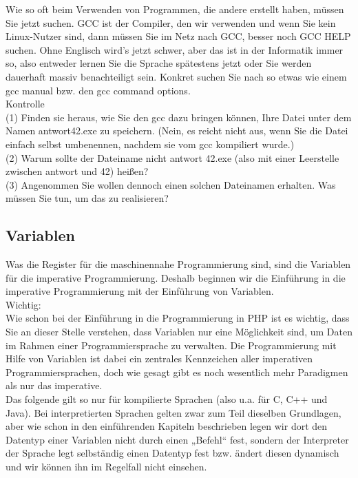 Wie so oft beim Verwenden von Programmen, die andere erstellt haben, müssen Sie jetzt suchen. GCC ist der Compiler, den wir verwenden und wenn Sie kein Linux-Nutzer sind, dann müssen Sie im Netz nach GCC, besser noch GCC HELP suchen. Ohne Englisch wird’s jetzt schwer, aber das ist in der Informatik immer so, also entweder lernen Sie die Sprache spätestens jetzt oder Sie werden dauerhaft massiv benachteiligt sein. Konkret suchen Sie nach so etwas wie einem gcc manual bzw. den gcc command options.\\

Kontrolle\\

(1)	Finden sie heraus, wie Sie den gcc dazu bringen können, Ihre Datei unter dem Namen antwort42.exe zu speichern. (Nein, es reicht nicht aus, wenn Sie die Datei einfach selbst umbenennen, nachdem sie vom gcc kompiliert wurde.)\\

(2)	Warum sollte der Dateiname nicht antwort 42.exe (also mit einer Leerstelle zwischen antwort und 42) heißen?\\

(3)	Angenommen Sie wollen dennoch einen solchen Dateinamen erhalten. Was müssen Sie tun, um das zu realisieren?\\

\subsection{Variablen}

Was die Register für die maschinennahe Programmierung sind, sind die Variablen für die imperative Programmierung. Deshalb beginnen wir die Einführung in die imperative Programmierung mit der Einführung von Variablen.\\

Wichtig:\\

Wie schon bei der Einführung in die Programmierung in PHP ist es wichtig, dass Sie an dieser Stelle verstehen, dass Variablen nur eine Möglichkeit sind, um Daten im Rahmen einer Programmiersprache zu verwalten. Die Programmierung mit Hilfe von Variablen ist dabei ein zentrales Kennzeichen aller imperativen Programmiersprachen, doch wie gesagt gibt es noch wesentlich mehr Paradigmen als nur das imperative.\\

Das folgende gilt so nur für kompilierte Sprachen (also u.a. für C, C++ und Java). Bei interpretierten Sprachen gelten zwar zum Teil dieselben Grundlagen, aber wie schon in den einführenden Kapiteln beschrieben legen wir dort den Datentyp einer Variablen nicht durch einen „Befehl“ fest, sondern der Interpreter der Sprache legt selbständig einen Datentyp fest bzw. ändert diesen dynamisch und wir können ihn im Regelfall nicht einsehen.\\

